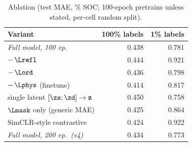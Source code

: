 \begin{table}[t]
\centering
\caption{Ablation (test MAE, \% SOC; 100-epoch pretrains unless stated, per-cell random split).}
\label{tab:abl}
\footnotesize
\begin{tabular}{lrr}
\toprule
Variant & 100\% labels & 1\% labels \\
\midrule
\textit{Full model, 100 ep.} & 0.438 & 0.781 \\
\quad $-\,\Lrefl$ & 0.444 & 0.921 \\
\quad $-\,\Lord$ & 0.436 & 0.798 \\
\quad $-\,\Lphys$ (finetune) & 0.414 & 0.817 \\
\quad single latent $[\zs;\zd]\to\mathbf{z}$ & 0.450 & 0.758 \\
\quad $\Lmask$ only (generic MAE) & 0.425 & 0.864 \\
\quad SimCLR-style contrastive & 0.424 & 0.922 \\
\textit{Full model, 200 ep.\ (v4)} & 0.434 & 0.773 \\
\bottomrule
\end{tabular}
\end{table}